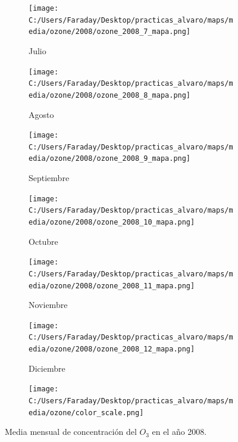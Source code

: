 \documentclass[12pt]{article}
\begin{document}
\begin{figure}[H]
\begin{subfigure}[H]{0.15\textwidth}
\texttt{[image: C:/Users/Faraday/Desktop/practicas\_alvaro/maps/media/ozone/2008/ozone\_2008\_7\_mapa.png]}
\captionsetup{labelformat=empty}
\caption{Julio}
\label{fig:map-ozone-2008-7}
\end{subfigure}
%
\begin{subfigure}[H]{0.15\textwidth}
\texttt{[image: C:/Users/Faraday/Desktop/practicas\_alvaro/maps/media/ozone/2008/ozone\_2008\_8\_mapa.png]}
\captionsetup{labelformat=empty}
\caption{Agosto}
\label{fig:map-ozone-2008-8}
\end{subfigure}
%
\begin{subfigure}[H]{0.15\textwidth}
\texttt{[image: C:/Users/Faraday/Desktop/practicas\_alvaro/maps/media/ozone/2008/ozone\_2008\_9\_mapa.png]}
\captionsetup{labelformat=empty}
\caption{Septiembre}
\label{fig:map-ozone-2008-9}
\end{subfigure}
%
\begin{subfigure}[H]{0.15\textwidth}
\texttt{[image: C:/Users/Faraday/Desktop/practicas\_alvaro/maps/media/ozone/2008/ozone\_2008\_10\_mapa.png]}
\captionsetup{labelformat=empty}
\caption{Octubre}
\label{fig:map-ozone-2008-10}
\end{subfigure}
%
\begin{subfigure}[H]{0.15\textwidth}
\texttt{[image: C:/Users/Faraday/Desktop/practicas\_alvaro/maps/media/ozone/2008/ozone\_2008\_11\_mapa.png]}
\captionsetup{labelformat=empty}
\caption{Noviembre}
\label{fig:map-ozone-2008-11}
\end{subfigure}
%
\begin{subfigure}[H]{0.15\textwidth}
\texttt{[image: C:/Users/Faraday/Desktop/practicas\_alvaro/maps/media/ozone/2008/ozone\_2008\_12\_mapa.png]}
\captionsetup{labelformat=empty}
\caption{Diciembre}
\label{fig:map-ozone-2008-12}
\end{subfigure}

\begin{subfigure}[H]{0.45\textwidth}
\texttt{[image: C:/Users/Faraday/Desktop/practicas\_alvaro/maps/media/ozone/color\_scale.png]}
\captionsetup{labelformat=empty}
\caption{}
\end{subfigure}

\vspace*{-7mm}
\caption{Media mensual de concentración del $O_{3}$ en el año 2008.}
\label{fig:map-ozone-2008}
\end{figure}
\end{document}
